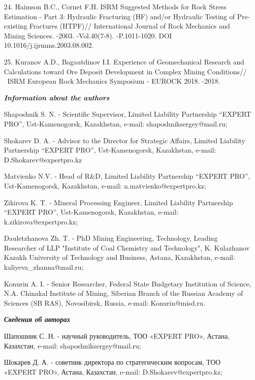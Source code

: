 \begin{refs}
24. Haimson B.C., Cornet F.H. ISRM Suggested Methods for Rock Stress
Estimation - Part 3: Hydraulic Fracturing (HF) and/or Hydraulic Testing
of Pre-existing Fractures (HTPF)// International Journal of Rock
Mechanics and Mining Sciences. -2003. -Vol.40(7-8). -P.1011-1020. DOI
10.1016/j.ijrmms.2003.08.002.

25. Kuranov A.D., Bagautdinov I.I. Experience of Geomechanical Research
and Calculations toward Ore Deposit Development in Complex Mining
Conditions// ~ISRM European Rock Mechanics Symposium - EUROCK 2018.
-2018.
\end{refs}

\begin{info}
\hspace{1em}\emph{{\bfseries Information about the authors}}

Shaposhnik S. N. - Scientific Supervisor, Limited Liability Partnership
``EXPERT PRO'', Ust-Kamenogorsk, Kazakhstan, e-mail:
shaposhniksergey@mail.ru;

Shokarev D. A. - Advisor to the Director for Strategic Affairs, Limited
Liability Partnership ``EXPERT PRO'', Ust-Kamenogorsk, Kazakhstan,
e-mail: D.Shokarev@expertpro.kz

Matvienko N.V. - Head of R\&D, Limited Liability Partnership ``EXPERT
PRO'', Ust-Kamenogorsk, Kazakhstan, e-mail:
n.matvienko@expertpro.kz;

Zikirova K. T. - Mineral Processing Engineer, Limited Liability
Partnership ``EXPERT PRO'', Ust-Kamenogorsk, Kazakhstan, e-mail:
k.zikirova@expertpro.kz;

Dauletzhanova Zh. T. - PhD Mining Engineering, Technology, Leading
Researcher of LLP "Institute of Coal Chemistry and Technology", K.
Kulazhanov Kazakh University of Technology and Business, Astana,
Kazakhstan, e-mail:
kaliyeva\_zhanna@mail.ru;

Konurin A. I. - Senior Researcher, Federal State Budgetary Institution
of Science, N.A. Chinakal Institute of Mining, Siberian Branch of the
Russian Academy of Sciences (SB RAS), Novosibirsk, Russia, e-mail:
Konurin@misd.ru.

\hspace{1em}\emph{{\bfseries Сведения об авторах}}

Шапошник С. Н. - научный руководитель, ТОО «EXPERT PRO», Астана,
Казахстан, e-mail: shaposhniksergey@mail.ru;

Шокарев Д. А. - советник директора по стратегическим вопросам, ТОО
«EXPERT PRO», Астана, Казахстан, e-mail:
D.Shokarev@expertpro.kz;


\end{info}

